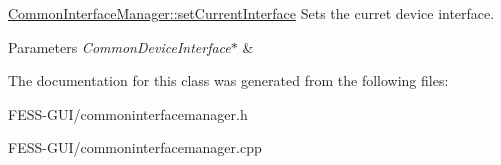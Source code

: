 \hyperlink{class_common_interface_manager_add704853a060d8cca441da322b748c19}{Common\+Interface\+Manager\+::set\+Current\+Interface} Sets the curret device interface. 


\begin{DoxyParams}{Parameters}
{\em Common\+Device\+Interface$\ast$} & \\
\hline
\end{DoxyParams}


The documentation for this class was generated from the following files\+:\begin{DoxyCompactItemize}
\item 
F\+E\+S\+S-\/\+G\+U\+I/commoninterfacemanager.\+h\item 
F\+E\+S\+S-\/\+G\+U\+I/commoninterfacemanager.\+cpp\end{DoxyCompactItemize}
